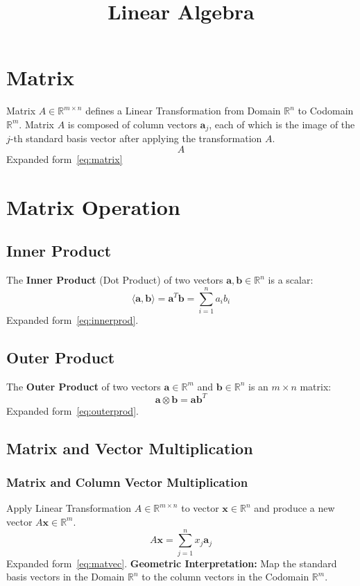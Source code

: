\documentclass{article}
\title{Linear Algebra}
\date{}
\begin{document}
\maketitle

\tableofcontents

\newpage
\section{Matrix}
Matrix $A \in \mathbb{R}^{m \times n}$ defines a Linear Transformation from Domain $\mathbb{R}^n$ to Codomain $\mathbb{R}^m$.
\newline
Matrix $A$ is composed of column vectors $\mathbf{a}_j$, each of which is the image of the $j$-th standard basis vector after applying the transformation $A$.
\[
    A
\]
Expanded form~\ref{eq:matrix}


\newpage
\section{Matrix Operation}

\subsection{Inner Product}
The \textbf{Inner Product} (Dot Product) of two vectors $\mathbf{a}, \mathbf{b} \in \mathbb{R}^n$ is a scalar:
\[
    \langle \mathbf{a}, \mathbf{b} \rangle = \mathbf{a}^T \mathbf{b} = \sum_{i=1}^n a_i b_i
\]
Expanded form~\ref{eq:innerprod}.

\subsection{Outer Product}
The \textbf{Outer Product} of two vectors $\mathbf{a} \in \mathbb{R}^m$ and $\mathbf{b} \in \mathbb{R}^n$ is an $m \times n$ matrix:
\[
    \mathbf{a} \otimes \mathbf{b} = \mathbf{a} \mathbf{b}^T
\]
Expanded form~\ref{eq:outerprod}.

\subsection{Matrix and Vector Multiplication}

\subsubsection{Matrix and Column Vector Multiplication}
Apply Linear Transformation $A \in \mathbb{R}^{m \times n}$ to vector $\mathbf{x} \in \mathbb{R}^n$ and produce a new vector $A\mathbf{x} \in \mathbb{R}^m$.
\[
    A\mathbf{x} = \sum_{j=1}^n x_j \mathbf{a}_j
\]
Expanded form~\ref{eq:matvec}.
\newline
\textbf{Geometric Interpretation:} Map the standard basis vectors in the Domain $\mathbb{R}^n$ to the column vectors in the Codomain $\mathbb{R}^m$.
\end{document}
